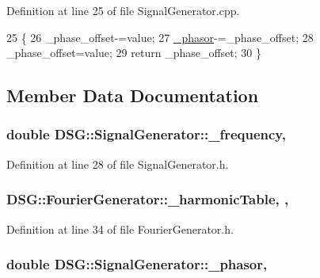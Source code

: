 Definition at line 25 of file Signal\+Generator.\+cpp.


\begin{DoxyCode}
25                                                                 \{
26     \_phase\_offset-=value;
27     \hyperlink{classDSG_1_1SignalGenerator_ac2271b582bf699275f077ecb642a8cd9}{\_phasor}-=\_phase\_offset;
28     \_phase\_offset=value;
29     \textcolor{keywordflow}{return} \_phase\_offset;
30 \}\end{DoxyCode}


\subsection{Member Data Documentation}
\hypertarget{classDSG_1_1SignalGenerator_a67e296e3506dcdf09402c667cddff9ac}{
\subsubsection[{\+\_\+frequency}]{\setlength{\rightskip}{0pt plus 5cm}double D\+S\+G\+::\+Signal\+Generator\+::\+\_\+frequency\hspace{0.3cm}{\ttfamily [protected]}, {\ttfamily [inherited]}}}\label{classDSG_1_1SignalGenerator_a67e296e3506dcdf09402c667cddff9ac}


Definition at line 28 of file Signal\+Generator.\+h.

\hypertarget{classDSG_1_1FourierGenerator_a7288408f8e44d5edb5eecc62480243d7}{
\subsubsection[{\+\_\+harmonic\+Table}]{ D\+S\+G\+::\+Fourier\+Generator\+::\+\_\+harmonic\+Table\hspace{0.3cm}{\ttfamily [static]}, {\ttfamily [protected]}, {\ttfamily [inherited]}}}\label{classDSG_1_1FourierGenerator_a7288408f8e44d5edb5eecc62480243d7}


Definition at line 34 of file Fourier\+Generator.\+h.

\hypertarget{classDSG_1_1SignalGenerator_ac2271b582bf699275f077ecb642a8cd9}{
\subsubsection[{\+\_\+phasor}]{\setlength{\rightskip}{0pt plus 5cm}double D\+S\+G\+::\+Signal\+Generator\+::\+\_\+phasor\hspace{0.3cm}{\ttfamily [protected]}, {\ttfamily [inherited]}}}\label{classDSG_1_1SignalGenerator_ac2271b582bf699275f077ecb642a8cd9}


